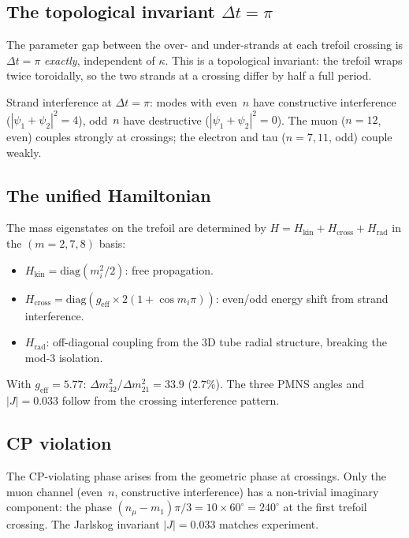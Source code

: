 \documentclass[11pt,a4paper]{article}
\begin{document}
\subsection{The topological invariant $\Delta t = \pi$}

The parameter gap between the over- and under-strands at each
trefoil crossing is $\Delta t = \pi$ \emph{exactly}, independent
of $\kappa$.  This is a topological invariant: the trefoil wraps
twice toroidally, so the two strands at a crossing differ by
half a full period.

Strand interference at $\Delta t = \pi$: modes with even~$n$
have constructive interference ($|ψ_1 + ψ_2|^2 = 4$), odd~$n$
have destructive ($|ψ_1 + ψ_2|^2 = 0$).  The muon ($n = 12$,
even) couples strongly at crossings; the electron and tau
($n = 7, 11$, odd) couple weakly.

\subsection{The unified Hamiltonian}

The mass eigenstates on the trefoil are determined by
$H = H_{\text{kin}} + H_{\text{cross}} + H_{\text{rad}}$
in the $(m = 2, 7, 8)$ basis:
\begin{itemize}
\item $H_{\text{kin}} = \mathrm{diag}(m_i^2/2)$:
  free propagation.
\item $H_{\text{cross}} = \mathrm{diag}(g_{\text{eff}} \times
  2(1+\cos m_i\pi))$: even/odd energy shift from strand
  interference.
\item $H_{\text{rad}}$: off-diagonal coupling from the 3D
  tube radial structure, breaking the mod-3 isolation.
\end{itemize}

With $g_{\text{eff}} = 5.77$: $\Delta m^2_{32}/\Delta m^2_{21}
= 33.9$ ($2.7\%$).  The three PMNS angles and $|J| = 0.033$
follow from the crossing interference pattern.

\subsection{CP violation}

The CP-violating phase arises from the geometric phase at
crossings.  Only the muon channel (even~$n$, constructive
interference) has a non-trivial imaginary component: the phase
$(n_\mu - m_1)\pi/3 = 10 \times 60^\circ = 240^\circ$ at
the first trefoil crossing.  The Jarlskog invariant
$|J| = 0.033$ matches experiment.
\end{document}
